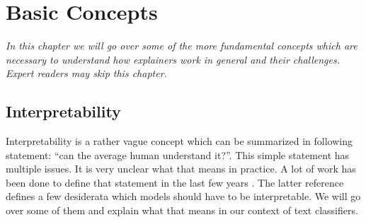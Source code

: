 
\chapter{Basic Concepts}
\label{chap:basics}

\textit{In this chapter we will go over some of the more fundamental concepts which are necessary to understand how explainers work in general and their challenges. Expert readers may skip this chapter.}

\section{Interpretability}

Interpretability is a rather vague concept which can be summarized in following statement: \enquote{can the average human understand it?}. This simple statement has multiple issues.
It is very unclear what that means in practice. A lot of work has been done to define that statement in the last few years \cite{lipton2017mythos}. The latter reference defines a few desiderata which models should have to be interpretable. We will go over some of them and explain what that means in our context of text classifiers.

